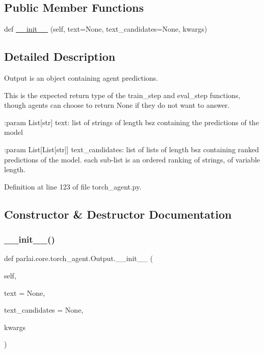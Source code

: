 \subsection*{Public Member Functions}
\begin{DoxyCompactItemize}
\item 
def \hyperlink{classparlai_1_1core_1_1torch__agent_1_1Output_a490f5e29040c643f20b63c23e7359627}{\+\_\+\+\_\+init\+\_\+\+\_\+} (self, text=None, text\+\_\+candidates=None, kwargs)
\end{DoxyCompactItemize}


\subsection{Detailed Description}
\begin{DoxyVerb}Output is an object containing agent predictions.

This is the expected return type of the train_step and eval_step functions,
though agents can choose to return None if they do not want to answer.

:param List[str] text:
    list of strings of length bsz containing the predictions of the model

:param List[List[str]] text_candidates:
    list of lists of length bsz containing ranked predictions of the model.
    each sub-list is an ordered ranking of strings, of variable length.
\end{DoxyVerb}
 

Definition at line 123 of file torch\+\_\+agent.\+py.



\subsection{Constructor \& Destructor Documentation}
\mbox{\label{classparlai_1_1core_1_1torch__agent_1_1Output_a490f5e29040c643f20b63c23e7359627}} 
\subsubsection{\texorpdfstring{\+\_\+\+\_\+init\+\_\+\+\_\+()}{\_\_init\_\_()}}
{\footnotesize\ttfamily def parlai.\+core.\+torch\+\_\+agent.\+Output.\+\_\+\+\_\+init\+\_\+\+\_\+ (\begin{DoxyParamCaption}\item[{}]{self,  }\item[{}]{text = {\ttfamily None},  }\item[{}]{text\+\_\+candidates = {\ttfamily None},  }\item[{}]{kwargs }\end{DoxyParamCaption})}



